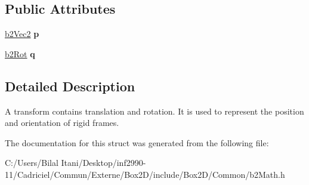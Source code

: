 \subsection*{Public Attributes}
\begin{DoxyCompactItemize}
\item 
\hyperlink{structb2_vec2}{b2\+Vec2} {\bfseries p}\hypertarget{structb2_transform_a9eeeb643a016c29a4d389e480ba6c628}{}\label{structb2_transform_a9eeeb643a016c29a4d389e480ba6c628}

\item 
\hyperlink{structb2_rot}{b2\+Rot} {\bfseries q}\hypertarget{structb2_transform_ae4aaac23f32686e165138c4e5dc4ce85}{}\label{structb2_transform_ae4aaac23f32686e165138c4e5dc4ce85}

\end{DoxyCompactItemize}


\subsection{Detailed Description}
A transform contains translation and rotation. It is used to represent the position and orientation of rigid frames. 

The documentation for this struct was generated from the following file\+:\begin{DoxyCompactItemize}
\item 
C\+:/\+Users/\+Bilal Itani/\+Desktop/inf2990-\/11/\+Cadriciel/\+Commun/\+Externe/\+Box2\+D/include/\+Box2\+D/\+Common/b2\+Math.\+h\end{DoxyCompactItemize}
